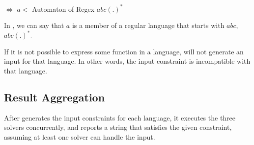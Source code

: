  $\iff$ $a <$ Automaton of Regex $abc(.)^{*}$

In \dprle, we can say that $a$ is a member of a regular language that starts with $abc$, $abc(.)^{*}$.

If it is not possible to express some function in a language, \imss will not generate an input
for that language. In other words, the input constraint is incompatible with that language.

\subsection{Result Aggregation}
After \imss generates the input constraints for each language, it executes the three solvers concurrently, and
reports a string that satisfies the given constraint, assuming at least one solver can handle the input.
